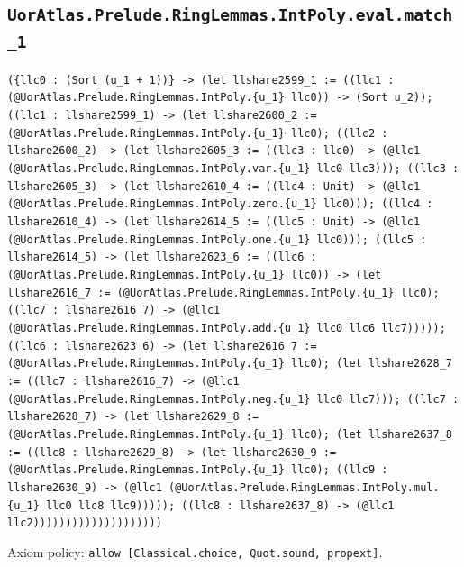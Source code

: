 \documentclass[11pt]{article}
\begin{document}
\subsection*{\texttt{UorAtlas.Prelude.RingLemmas.IntPoly.eval.match\_1}}
\noindent\texttt{(\{llc0 : (Sort (u\_1 + 1))\} -> (let llshare2599\_1 := ((llc1 : (@UorAtlas.Prelude.RingLemmas.IntPoly.\{u\_1\} llc0)) -> (Sort u\_2)); ((llc1 : llshare2599\_1) -> (let llshare2600\_2 := (@UorAtlas.Prelude.RingLemmas.IntPoly.\{u\_1\} llc0); ((llc2 : llshare2600\_2) -> (let llshare2605\_3 := ((llc3 : llc0) -> (@llc1 (@UorAtlas.Prelude.RingLemmas.IntPoly.var.\{u\_1\} llc0 llc3))); ((llc3 : llshare2605\_3) -> (let llshare2610\_4 := ((llc4 : Unit) -> (@llc1 (@UorAtlas.Prelude.RingLemmas.IntPoly.zero.\{u\_1\} llc0))); ((llc4 : llshare2610\_4) -> (let llshare2614\_5 := ((llc5 : Unit) -> (@llc1 (@UorAtlas.Prelude.RingLemmas.IntPoly.one.\{u\_1\} llc0))); ((llc5 : llshare2614\_5) -> (let llshare2623\_6 := ((llc6 : (@UorAtlas.Prelude.RingLemmas.IntPoly.\{u\_1\} llc0)) -> (let llshare2616\_7 := (@UorAtlas.Prelude.RingLemmas.IntPoly.\{u\_1\} llc0); ((llc7 : llshare2616\_7) -> (@llc1 (@UorAtlas.Prelude.RingLemmas.IntPoly.add.\{u\_1\} llc0 llc6 llc7))))); ((llc6 : llshare2623\_6) -> (let llshare2616\_7 := (@UorAtlas.Prelude.RingLemmas.IntPoly.\{u\_1\} llc0); (let llshare2628\_7 := ((llc7 : llshare2616\_7) -> (@llc1 (@UorAtlas.Prelude.RingLemmas.IntPoly.neg.\{u\_1\} llc0 llc7))); ((llc7 : llshare2628\_7) -> (let llshare2629\_8 := (@UorAtlas.Prelude.RingLemmas.IntPoly.\{u\_1\} llc0); (let llshare2637\_8 := ((llc8 : llshare2629\_8) -> (let llshare2630\_9 := (@UorAtlas.Prelude.RingLemmas.IntPoly.\{u\_1\} llc0); ((llc9 : llshare2630\_9) -> (@llc1 (@UorAtlas.Prelude.RingLemmas.IntPoly.mul.\{u\_1\} llc0 llc8 llc9))))); ((llc8 : llshare2637\_8) -> (@llc1 llc2))))))))))))))))))))}\par
\noindent Axiom policy: \texttt{allow [Classical.choice, Quot.sound, propext]}.\par
\end{document}
